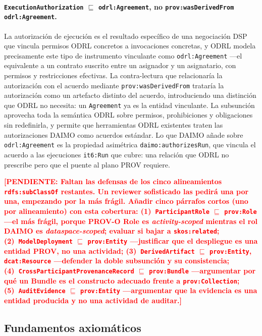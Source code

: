 \documentclass[11pt,a4paper]{article}
\newcommand{\code}[1]{\texttt{#1}}
\newcommand{\TODO}[1]{\textcolor{red}{\textbf{[PENDIENTE: #1]}}}
\begin{document}
\paragraph{\code{ExecutionAuthorization} $\sqsubseteq$ \code{odrl:Agreement}, no \code{prov:wasDerivedFrom odrl:Agreement}.} La autorización de ejecución es el resultado específico de una negociación DSP que vincula permisos ODRL concretos a invocaciones concretas, y ODRL modela precisamente este tipo de instrumento vinculante como \code{odrl:Agreement} ---el equivalente a un contrato suscrito entre un asignador y un asignatario, con permisos y restricciones efectivas. La contra-lectura que relacionaría la autorización con el acuerdo mediante \code{prov:wasDerivedFrom} trataría la autorización como un artefacto distinto del acuerdo, introduciendo una distinción que ODRL no necesita: un \code{Agreement} ya es la entidad vinculante. La subsunción aprovecha toda la semántica ODRL sobre permisos, prohibiciones y obligaciones sin redefinirla, y permite que herramientas ODRL existentes traten las autorizaciones DAIMO como acuerdos estándar. Lo que DAIMO añade sobre \code{odrl:Agreement} es la propiedad asimétrica \code{daimo:authorizesRun}, que vincula el acuerdo a las ejecuciones \code{it6:Run} que cubre: una relación que ODRL no prescribe pero que el puente al plano PROV requiere.

\TODO{Faltan las defensas de los cinco alineamientos \code{rdfs:subClassOf} restantes. Un reviewer sofisticado las pedirá una por una, empezando por la más frágil. Añadir cinco párrafos cortos (uno por alineamiento) con esta cobertura: (1)~\code{ParticipantRole} $\sqsubseteq$ \code{prov:Role} ---el más frágil, porque PROV-O Role es \emph{activity-scoped} mientras el rol DAIMO es \emph{dataspace-scoped}; evaluar si bajar a \code{skos:related}; (2)~\code{ModelDeployment} $\sqsubseteq$ \code{prov:Entity} ---justificar que el despliegue es una entidad PROV, no una actividad; (3)~\code{DerivedArtifact} $\sqsubseteq$ \code{prov:Entity}, \code{dcat:Resource} ---defender la doble subsunción y su consistencia; (4)~\code{CrossParticipantProvenanceRecord} $\sqsubseteq$ \code{prov:Bundle} ---argumentar por qué un Bundle es el constructo adecuado frente a \code{prov:Collection}; (5)~\code{AuditEvidence} $\sqsubseteq$ \code{prov:Entity} ---argumentar que la evidencia es una entidad producida y no una actividad de auditar.}

\subsection{Fundamentos axiomáticos}\label{sec:axiomatic}
\end{document}
